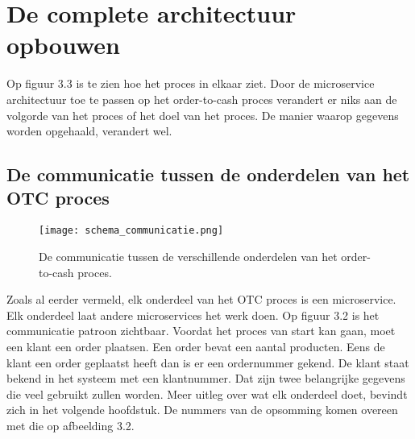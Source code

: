 \section{De complete architectuur opbouwen}
Op figuur 3.3 is te zien hoe het proces in elkaar ziet. Door de microservice architectuur toe te passen op het order-to-cash proces verandert er niks aan de volgorde van het proces of het doel van het proces. De manier waarop gegevens worden opgehaald, verandert wel. 

\subsection{De communicatie tussen de onderdelen van het OTC proces}

\begin{figure}[h]
	\texttt{[image: schema\_communicatie.png]}
	\caption{De communicatie tussen de verschillende onderdelen van het order-to-cash proces.}
	\centering
\end{figure}
Zoals al eerder vermeld, elk onderdeel van het OTC proces is een microservice. Elk onderdeel laat andere microservices het werk doen.
Op figuur 3.2 is het communicatie patroon zichtbaar.
Voordat het proces van start kan gaan, moet een klant een order plaatsen. Een order bevat een aantal producten. Eens de klant een order geplaatst heeft dan is er een ordernummer gekend. De klant staat bekend in het systeem met een klantnummer. Dat zijn twee belangrijke gegevens die veel gebruikt zullen worden.
Meer uitleg over wat elk onderdeel doet, bevindt zich in het volgende hoofdstuk.
De nummers van de opsomming komen overeen met die op afbeelding 3.2.
